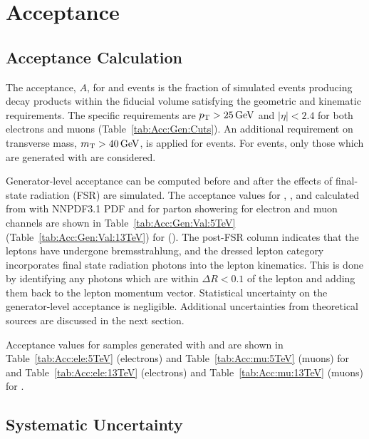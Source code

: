 \chapter{Acceptance}

\section{Acceptance Calculation}
The acceptance, $A$, for \Wpm and \Z events is the fraction of simulated events producing decay products within the fiducial volume satisfying the geometric and kinematic requirements. The specific requirements are $p_{\mathrm{T}}>25\,\text{Ge\hspace{-.08em}V}$ and $|\eta| < 2.4$ for both electrons and muons (Table~\ref{tab:Acc:Gen:Cuts}). An additional requirement on transverse mass, $m_{\mathrm{T}} > 40 \,\text{Ge\hspace{-.08em}V}$, is applied for \Wpm events. For \Z events, only those which are generated with \masswindow are considered.

Generator-level acceptance can be computed before and after the effects of final-state radiation (FSR) are simulated. The acceptance values for \Wp, \Wm, and \Z calculated from \aMCATNLO with NNPDF3.1 PDF and  for parton showering for electron and muon channels are shown in Table~\ref{tab:Acc:Gen:Val:5TeV} (Table~\ref{tab:Acc:Gen:Val:13TeV}) for \serag (\serah). The post-FSR column indicates that the leptons have undergone bremsstrahlung, and the dressed lepton category incorporates final state radiation photons into the lepton kinematics. This is done by identifying any photons which are within $\Delta R < 0.1$ of the lepton and adding them back to the lepton momentum vector. Statistical uncertainty on the generator-level acceptance is negligible. Additional uncertainties from theoretical sources are discussed in the next section.



Acceptance values for samples generated with \aMCATNLO and \POWHEG are shown in Table~\ref{tab:Acc:ele:5TeV} (electrons) and Table~\ref{tab:Acc:mu:5TeV} (muons) for \serag and Table~\ref{tab:Acc:ele:13TeV} (electrons) and Table~\ref{tab:Acc:mu:13TeV} (muons) for \serah. 



\section{Systematic Uncertainty}\label{ch:acc:unc}

